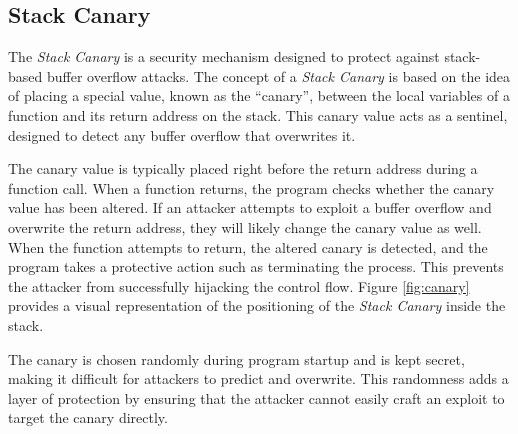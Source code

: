 \subsection{Stack Canary}
\label{subsec:background_canaries}

The \textit{Stack Canary} is a security mechanism designed to protect against stack-based
buffer overflow attacks. The concept of a \textit{Stack Canary} is based on the idea
of placing a special value, known as the ``canary'', between the local variables
of a function and its return address on the stack. This canary value acts as a
sentinel, designed to detect any buffer overflow that overwrites it.

The canary value is typically placed right before the return address during a function
call. When a function returns, the program checks whether the canary value has been
altered. If an attacker attempts to exploit a buffer overflow and overwrite the
return address, they will likely change the canary value as well. When the
function attempts to return, the altered canary is detected, and the program
takes a protective action such as terminating the process. This prevents the attacker
from successfully hijacking the control flow. Figure \ref{fig:canary} provides a
visual representation of the positioning of the \textit{Stack Canary} inside the
stack.

The canary is chosen randomly during program startup and is kept secret, making
it difficult for attackers to predict and overwrite. This randomness adds a layer
of protection by ensuring that the attacker cannot easily craft an exploit to target
the canary directly.


